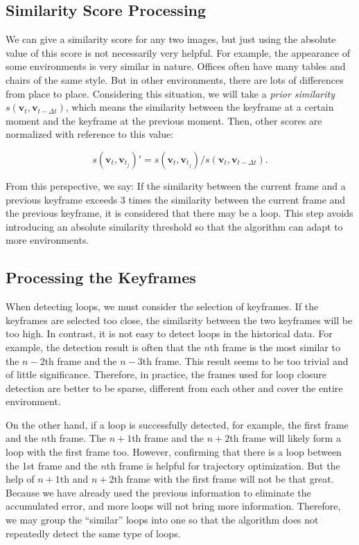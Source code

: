 \subsection{Similarity Score Processing}
We can give a similarity score for any two images, but just using the absolute value of this score is not necessarily very helpful. For example, the appearance of some environments is very similar in nature. Offices often have many tables and chairs of the same style. But in other environments, there are lots of differences from place to place. Considering this situation, we will take a \textit{prior similarity} $s\left( \mathbf{v}_t, \mathbf{v}_{t-\Delta t}\right)$, which means the similarity between the keyframe at a certain moment and the keyframe at the previous moment. Then, other scores are normalized with reference to this value:

\begin{equation}
	s\left( \mathbf{v}_t, \mathbf{v}_{t_j}\right)' = s\left( \mathbf{v}_t, \mathbf{v}_{t_j}\right) / s\left( \mathbf{v}_t, \mathbf{v}_{t-\Delta t}\right).
\end{equation}

From this perspective, we say: If the similarity between the current frame and a previous keyframe exceeds 3 times the similarity between the current frame and the previous keyframe, it is considered that there may be a loop. This step avoids introducing an absolute similarity threshold so that the algorithm can adapt to more environments.

\subsection{Processing the Keyframes}
When detecting loops, we must consider the selection of keyframes. If the keyframes are selected too close, the similarity between the two keyframes will be too high. In contrast, it is not easy to detect loops in the historical data. For example, the detection result is often that the $n$th frame is the most similar to the $n-2$th frame and the $n-3$th frame. This result seems to be too trivial and of little significance. Therefore, in practice, the frames used for loop closure detection are better to be sparse, different from each other and cover the entire environment.

On the other hand, if a loop is successfully detected, for example, the first frame and the $n$th frame. The $n+1$th frame and the $n+2$th frame will likely form a loop with the first frame too. However, confirming that there is a loop between the 1st frame and the $n$th frame is helpful for trajectory optimization. But the help of $n+1$th and $n+2$th frame with the first frame will not be that great. Because we have already used the previous information to eliminate the accumulated error, and more loops will not bring more information. Therefore, we may group the ``similar'' loops into one so that the algorithm does not repeatedly detect the same type of loops.

